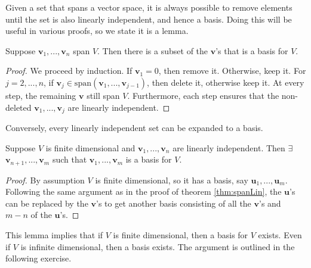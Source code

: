 Given a set that spans a vector space, it is always possible to remove
elements until the set is also linearly independent, and hence a
basis. Doing this will be useful in various proofs, so we state it is
a lemma.
\begin{lemma}\label{lem:spanToBasis}
  Suppose $\mathbf{v}_1, ..., \mathbf{v}_n$ span $V$. Then there is a
  subset of the $\mathbf{v}$'s that is a basis for $V$.
\end{lemma}
\begin{proof}
  We proceed by induction. If $\mathbf{v}_1 = 0$, then remove
  it. Otherwise, keep it. For $j=2,..., n$, if $\mathbf{v}_j \in
  \text{span}(\mathbf{v}_1, ..., \mathbf{v}_{j-1})$, then delete it,
  otherwise keep it. At every step, the remaining $\mathbf{v}$ still
  span $V$. Furthermore, each step ensures that the non-deleted
  $\mathbf{v}_1, ..., \mathbf{v}_j$ are linearly independent. 
\end{proof}
Conversely, every linearly independent set can be expanded to a
basis. 
\begin{lemma}\label{lem:linToBasis}
  Suppose $V$ is finite dimensional and $\mathbf{v}_1, ...,
  \mathbf{v}_n$ are linearly independent.  Then $\exists$
  $\mathbf{v}_{n+1}, ... , \mathbf{v}_m$ such that $\mathbf{v}_1, ...,
  \mathbf{v}_m$ is a basis for $V$.
\end{lemma}
\begin{proof}
  By assumption $V$ is finite dimensional, so it has a basis, say
  $\mathbf{u}_1, ..., \mathbf{u}_m$. Following the same argument as in
  the proof of theorem \ref{thm:spanLin}, the $\mathbf{u}$'s can be
  replaced by the $\mathbf{v}$'s to get another basis consisting of
  all the $\mathbf{v}$'s and $m-n$ of the $\mathbf{u}$'s.
\end{proof}
This lemma implies that if $V$ is finite dimensional, then a basis for
$V$ exists. Even if $V$ is infinite dimensional, then a basis
exists. The argument is outlined in the following exercise.
